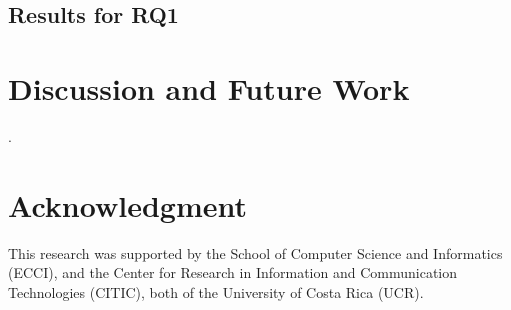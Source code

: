 \documentclass[conference]{IEEEtran}
\begin{document}
\subsection{Results for RQ1}
\label{sec:ResultsRQ1}


\section{Discussion and Future Work}
\label{sec:Discussion}

.


\section*{Acknowledgment}

This research was supported by the School of Computer Science and Informatics (ECCI), and the Center for Research in Information and Communication Technologies (CITIC), both of the University of Costa Rica (UCR).




\end{document}
